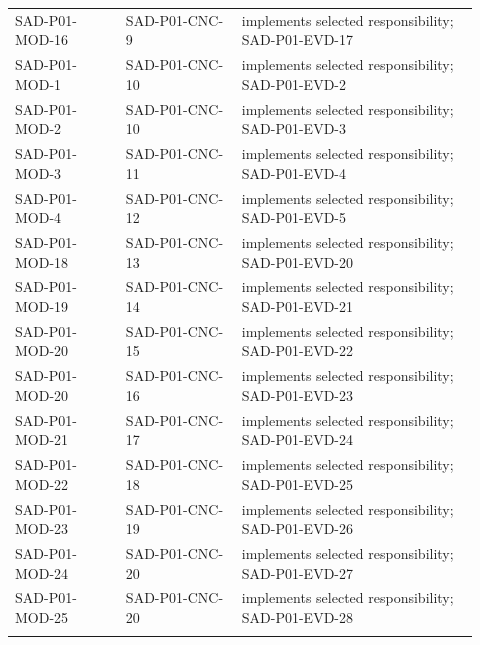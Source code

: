 \documentclass[10pt,letterpaper]{article}
\begin{document}
\begin{longtable}{@{}>{\raggedright\arraybackslash}p{0.22\linewidth}>{\raggedright\arraybackslash}p{0.23\linewidth}>{\raggedright\arraybackslash}p{0.47\linewidth}@{}}
SAD-P01-MOD-16 & SAD-P01-CNC-9 & implements selected responsibility; SAD-P01-EVD-17\\\addlinespace
SAD-P01-MOD-1 & SAD-P01-CNC-10 & implements selected responsibility; SAD-P01-EVD-2\\\addlinespace
SAD-P01-MOD-2 & SAD-P01-CNC-10 & implements selected responsibility; SAD-P01-EVD-3\\\addlinespace
SAD-P01-MOD-3 & SAD-P01-CNC-11 & implements selected responsibility; SAD-P01-EVD-4\\\addlinespace
SAD-P01-MOD-4 & SAD-P01-CNC-12 & implements selected responsibility; SAD-P01-EVD-5\\\addlinespace
SAD-P01-MOD-18 & SAD-P01-CNC-13 & implements selected responsibility; SAD-P01-EVD-20\\\addlinespace
SAD-P01-MOD-19 & SAD-P01-CNC-14 & implements selected responsibility; SAD-P01-EVD-21\\\addlinespace
SAD-P01-MOD-20 & SAD-P01-CNC-15 & implements selected responsibility; SAD-P01-EVD-22\\\addlinespace
SAD-P01-MOD-20 & SAD-P01-CNC-16 & implements selected responsibility; SAD-P01-EVD-23\\\addlinespace
SAD-P01-MOD-21 & SAD-P01-CNC-17 & implements selected responsibility; SAD-P01-EVD-24\\\addlinespace
SAD-P01-MOD-22 & SAD-P01-CNC-18 & implements selected responsibility; SAD-P01-EVD-25\\\addlinespace
SAD-P01-MOD-23 & SAD-P01-CNC-19 & implements selected responsibility; SAD-P01-EVD-26\\\addlinespace
SAD-P01-MOD-24 & SAD-P01-CNC-20 & implements selected responsibility; SAD-P01-EVD-27\\\addlinespace
SAD-P01-MOD-25 & SAD-P01-CNC-20 & implements selected responsibility; SAD-P01-EVD-28\\\addlinespace
\bottomrule\end{longtable}
\end{document}
